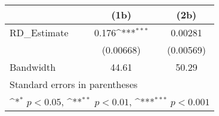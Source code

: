 {
\def\sym#1{\ifmmode^{#1}\else\(^{#1}\)\fi}
\begin{tabular}{l*{2}{c}}
\hline\hline
                    &\multicolumn{1}{c}{(1b)}&\multicolumn{1}{c}{(2b)}\\
\hline
RD\_Estimate         &       0.176\sym{***}&     0.00281         \\
                    &   (0.00668)         &   (0.00569)         \\
\hline
Bandwidth           &       44.61         &       50.29         \\
\hline\hline
\multicolumn{3}{l}{\footnotesize Standard errors in parentheses}\\
\multicolumn{3}{l}{\footnotesize \sym{*} \(p<0.05\), \sym{**} \(p<0.01\), \sym{***} \(p<0.001\)}\\
\end{tabular}
}
